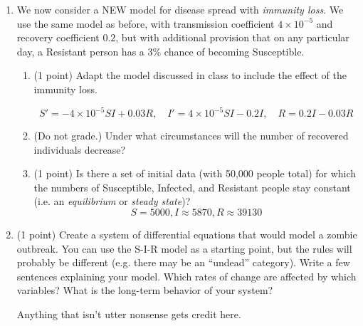 \documentclass[12pt]{article}
\begin{document}
\begin{enumerate}
\begin{enumerate}
  \item {\color{red} (1 point)} Even though $S$ and $R$ are functions of time, is still makes sense to think about how these two quanities relate to one another. Using chain rule from Calc 1, we know $\frac{dS}{dR}\frac{dR}{dt}=\frac{dS}{dt}$. Assuming $I\neq0$, solve for $\frac{dS}{dR}$ and then find $S$ as a function of $R$.
  
  {\color{red} $$\frac{dS}{dR}=-\frac{10^{-5}SI}{I/14}=-0.00014S$$
  $$S(R)=Ce^{-0.00014R},\quad S(2500)=45400$$
  $$S(R)\approx 64426e^{-0.00014R}$$}
  
  \item (Bonus{\color{red} (1 point)}) Does everyone on the island eventually get sick? Or do some susceptible people remain? Explain your answer both numerically (using the data from part a) and analytically (using your equation from part b).
  
  {\color{red} For half a point, they can explain numerically, and note that $S$ seems to stabilize at 29 or 30. For the other half point, they can realize that if $S(R)\approx 64426e^{-0.00014R}$ and $S+R<50000$, then $S>29$.}
 \end{enumerate}
 

 \item We now consider a NEW model for disease spread with \emph{immunity loss}. We use the same model as before, with transmission coefficient $4\times 10^{-5}$ and recovery coefficient $0.2$, but with additional provision that on any particular day, a Resistant person has a $3\%$ chance of becoming Susceptible.
 
 \begin{enumerate}
  \item {\color{red} (1 point)} Adapt the model discussed in class to include the effect of the immunity loss. 
  
  {\color{red} $$S'=-4\times 10^{-5}SI+0.03R,\quad I'=4\times 10^{-5}SI-0.2I,\quad R=0.2I-0.03R$$}
  \item {\color{red} (Do not grade.)} Under what circumstances will the number of recovered individuals decrease?
  \item {\color{red} (1 point)} Is there a set of initial data (with 50,000 people total) for which the numbers of Susceptible, Infected, and Resistant people stay constant (i.e. an \emph{equilibrium} or \emph{steady state})?
  {\color{red} $$S=5000, I\approx5870, R\approx39130$$}
 \end{enumerate}

 
 \item {\color{red} (1 point)} Create a system of differential equations that would model a zombie outbreak. You can use the S-I-R model as a starting point, but the rules will probably be different (e.g. there may be an ``undead'' category). Write a few sentences explaining your model. Which rates of change are affected by which variables? What is the long-term behavior of your system?
 
 {\color{red} Anything that isn't utter nonsense gets credit here.}

\end{enumerate}
\end{document}
